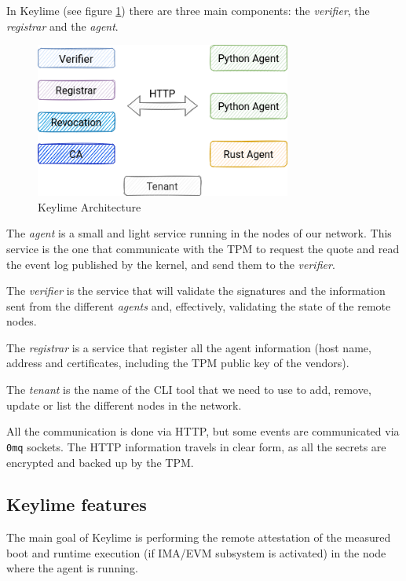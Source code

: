 \documentclass{article}
\begin{document}
In Keylime (see figure \ref{fig:keylimearch}) there are three main
components: the \emph{verifier}, the \emph{registrar} and the
\emph{agent}.

\begin{figure}[h]
  \centering
  \includegraphics[width=0.75\textwidth]{keylimearch}
  \caption{Keylime Architecture}
  \label{fig:keylimearch}
\end{figure}

The \emph{agent} is a small and light service running in the nodes of
our network.  This service is the one that communicate with the TPM to
request the quote and read the event log published by the kernel, and
send them to the \emph{verifier}.

The \emph{verifier} is the service that will validate the signatures
and the information sent from the different \emph{agents} and,
effectively, validating the state of the remote nodes.

The \emph{registrar} is a service that register all the agent
information (host name, address and certificates, including the TPM
public key of the vendors).

The \emph{tenant} is the name of the CLI tool that we need to use to
add, remove, update or list the different nodes in the network.

All the communication is done via HTTP, but some events are
communicated via \texttt{0mq} sockets.  The HTTP information travels
in clear form, as all the secrets are encrypted and backed up by the
TPM.

\subsection{Keylime features}
The main goal of Keylime is performing the remote attestation of the
measured boot and runtime execution (if IMA/EVM subsystem is
activated) in the node where the agent is running.
\end{document}
